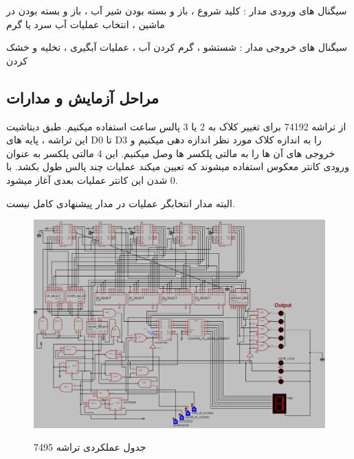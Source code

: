 \documentclass[twoside]{article}
\begin{document}
	سیگنال های ورودی مدار : کلید شروع ، باز و بسته بودن شیر آب ، باز و بسته بودن در ماشین ، انتخاب عملیات آب سرد یا گرم
	
	سیگنال های خروجی مدار : شستشو ، گرم کردن آب ، عملیات آبگیری ، تخلیه و خشک کردن
	

	
	\subsection*{مراحل آزمایش و مدارات}
	از تراشه 74192 برای تغییر کلاک به 2 یا 3 پالس ساعت استفاده میکنیم. طبق دیتاشیت این تراشه ، پایه های D0 تا D3 را به اندازه کلاک مورد نظر اندازه دهی میکنیم و خروجی های آن ها را به مالتی پلکسر ها وصل میکنیم. این 4 مالتی پلکسر به عنوان ورودی کانتر معکوس استفاده میشوند که تعیین میکند عملیات چند پالس طول بکشد. با 0 شدن این کانتر عملیات بعدی آغاز میشود.
	
	البته مدار انتخابگر عملیات در مدار پیشنهادی کامل نیست.
	
	\begin{figure}[h!]
		\begin{center}
			\includegraphics[scale=0.4]{madar}‎
			\caption{ جدول عملکردی تراشه 7495}
		\end{center}
	\end{figure} 
\end{document}
